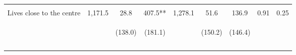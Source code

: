 \begin{tabular}{lcccccccc}
 & \begin{footnotesize}\end{footnotesize} & \begin{footnotesize}[1.000]\end{footnotesize} & \begin{footnotesize}[0.036]\end{footnotesize} & \begin{footnotesize}\end{footnotesize} & \begin{footnotesize}[1.000]\end{footnotesize} & \begin{footnotesize}[0.632]\end{footnotesize} & \begin{footnotesize}\end{footnotesize} & \begin{footnotesize}\end{footnotesize}\\
\noalign{\smallskip}Lives close to the centre & 1,171.5 & 28.8 & 407.5** & 1,278.1 & 51.6 & 136.9 & 0.91 & 0.25\\
 & \begin{footnotesize}\end{footnotesize} & \begin{footnotesize}(138.0)\end{footnotesize} & \begin{footnotesize}(181.1)\end{footnotesize} & \begin{footnotesize}\end{footnotesize} & \begin{footnotesize}(150.2)\end{footnotesize} & \begin{footnotesize}(146.4)\end{footnotesize} & \begin{footnotesize}\end{footnotesize} & \begin{footnotesize}\end{footnotesize}\\
 & \begin{footnotesize}\end{footnotesize} & \begin{footnotesize}[1.000]\end{footnotesize} & \begin{footnotesize}[0.036]\end{footnotesize} & \begin{footnotesize}\end{footnotesize} & \begin{footnotesize}[1.000]\end{footnotesize} & \begin{footnotesize}[0.632]\end{footnotesize} & \begin{footnotesize}\end{footnotesize} & \begin{footnotesize}\end{footnotesize}\\
\noalign{\smallskip}\hline\end{tabular}
